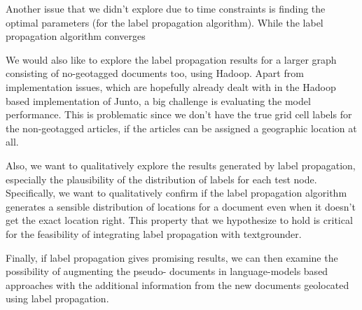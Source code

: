 \par Another issue that we didn't explore due to time constraints is finding
the optimal parameters (for the label propagation algorithm). While the label
propagation algorithm converges 

\par We would also like to explore the label propagation results for a larger
graph consisting of no-geotagged documents too, using Hadoop. Apart from
implementation issues, which are hopefully already dealt with in the Hadoop
based implementation of Junto, a big challenge is evaluating the model
performance. This is problematic since we don't have the true grid cell labels
for the non-geotagged articles, if the articles can be assigned a geographic
location at all.

\par Also, we want to qualitatively explore the results generated by label
propagation, especially the plausibility  of the distribution of labels for each test node.
Specifically, we want to qualitatively confirm if the label propagation
algorithm generates a sensible distribution of locations for a document even
when it doesn't get the exact location right. This property that we hypothesize
to hold is critical for the feasibility of integrating label propagation with
textgrounder.

\par Finally, if label propagation
gives promising results, we can then examine the possibility of augmenting the
pseudo- documents in language-models based approaches with the additional
information from the new documents geolocated using label propagation.

